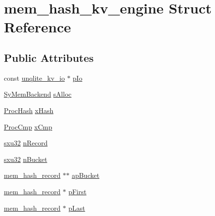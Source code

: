 \hypertarget{structmem__hash__kv__engine}{\section{mem\-\_\-hash\-\_\-kv\-\_\-engine Struct Reference}
\label{dc/d59/structmem__hash__kv__engine}
}
\subsection*{Public Attributes}
\begin{DoxyCompactItemize}
\item 
const \hyperlink{structunqlite__kv__io}{unqlite\-\_\-kv\-\_\-io} $\ast$ \hyperlink{structmem__hash__kv__engine_ace5f5b6ced7a99d5cfa5dc84eb34b93f}{p\-Io}
\item 
\hyperlink{struct_sy_mem_backend}{Sy\-Mem\-Backend} \hyperlink{structmem__hash__kv__engine_af842fb8c42194246cf28c324b5c5a307}{s\-Alloc}
\item 
\hyperlink{unqlite_8c_a38d523bbe0ae0e849597c37b22bfe806}{Proc\-Hash} \hyperlink{structmem__hash__kv__engine_a2ee33282995ee7fd7541e07f968aae0b}{x\-Hash}
\item 
\hyperlink{unqlite_8c_a60d84ee80a4995e96155889025d0603c}{Proc\-Cmp} \hyperlink{structmem__hash__kv__engine_a5c1a88bcf6aacfdd9bc59b71223f2b2c}{x\-Cmp}
\item 
\hyperlink{unqlite_8c_abc5a8a3f345c200c98c485551f49666e}{sxu32} \hyperlink{structmem__hash__kv__engine_a709f284075a90a1ddba0111826119eac}{n\-Record}
\item 
\hyperlink{unqlite_8c_abc5a8a3f345c200c98c485551f49666e}{sxu32} \hyperlink{structmem__hash__kv__engine_af5813b20b6ae765da4ce658359b5475c}{n\-Bucket}
\item 
\hyperlink{structmem__hash__record}{mem\-\_\-hash\-\_\-record} $\ast$$\ast$ \hyperlink{structmem__hash__kv__engine_ab8b648f9badc47c358ed241af6dc973a}{ap\-Bucket}
\item 
\hyperlink{structmem__hash__record}{mem\-\_\-hash\-\_\-record} $\ast$ \hyperlink{structmem__hash__kv__engine_a5257c5dbd50a02724d723bce27fd521f}{p\-First}
\item 
\hyperlink{structmem__hash__record}{mem\-\_\-hash\-\_\-record} $\ast$ \hyperlink{structmem__hash__kv__engine_aba01d0c9f47c67a70433e4d9d0f1ae51}{p\-Last}
\end{DoxyCompactItemize}


